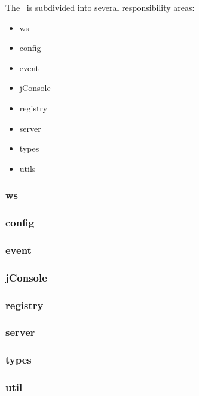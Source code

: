     The \varWebServer~is subdivided into several responsibility areas:

    \begin{itemize}
      \item ws
      \item config
      \item event
      \item jConsole
      \item registry
      \item server
      \item types
      \item utils
    \end{itemize} 
    
    \subsubsection{ws}
         
    \subsubsection{config}
         
    \subsubsection{event}
         
    \subsubsection{jConsole}
         
    \subsubsection{registry}
         
    \subsubsection{server}
         
    \subsubsection{types}
    
    \subsubsection{util}